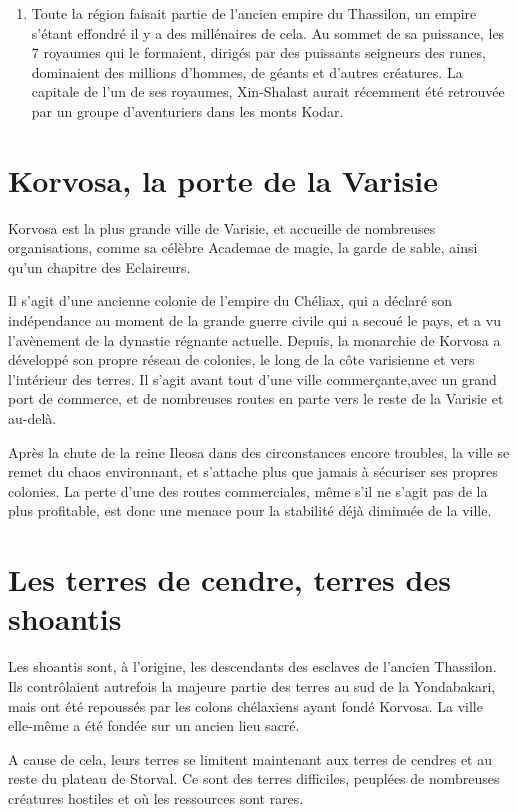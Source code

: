 \documentclass[letterpaper,10pt,twoside,twocolumn,openany]{book}
\begin{document}
\begin{enumerate}
    \item Toute la région faisait partie de l'ancien empire du Thassilon, un empire s'étant effondré il y a des millénaires de cela. Au sommet de sa puissance, les 7 royaumes qui le formaient, dirigés par des puissants seigneurs des runes, dominaient des millions d'hommes, de géants et d'autres créatures. La capitale de l'un de ses royaumes, Xin-Shalast aurait récemment été retrouvée par un groupe d'aventuriers dans les monts Kodar.
\end{enumerate}
\section{Korvosa, la porte de la Varisie}
Korvosa est la plus grande ville de Varisie, et accueille de nombreuses organisations, comme sa célèbre Academae de magie, la garde de sable, ainsi qu'un chapitre des Eclaireurs. 

Il s'agit d'une ancienne colonie de l'empire du Chéliax, qui a déclaré son indépendance au moment de la grande guerre civile qui a secoué le pays, et a vu l'avènement de la dynastie régnante actuelle. Depuis, la monarchie de Korvosa a développé son propre réseau de colonies, le long de la côte varisienne et vers l'intérieur des terres. Il s'agit avant tout d'une ville commerçante,avec un grand port de commerce, et de nombreuses routes en parte vers le reste de la Varisie et au-delà. 

Après la chute de la reine Ileosa dans des circonstances encore troubles, la ville se remet du chaos environnant, et s'attache plus que jamais à sécuriser ses propres colonies. La perte d'une des routes commerciales, même s'il ne s'agit pas de la plus profitable, est donc une menace pour la stabilité déjà diminuée de la ville.

\section{Les terres de cendre, terres des shoantis}
Les shoantis sont, à l'origine, les descendants des esclaves de l'ancien Thassilon. Ils contrôlaient autrefois la majeure partie des terres au sud de la Yondabakari, mais ont été repoussés par les colons chélaxiens ayant fondé Korvosa. La ville elle-même a été fondée sur un ancien lieu sacré.

A cause de cela, leurs terres se limitent maintenant aux terres de cendres et au reste du plateau de Storval. Ce sont des terres difficiles, peuplées de nombreuses créatures hostiles et où les ressources sont rares.
\end{document}

